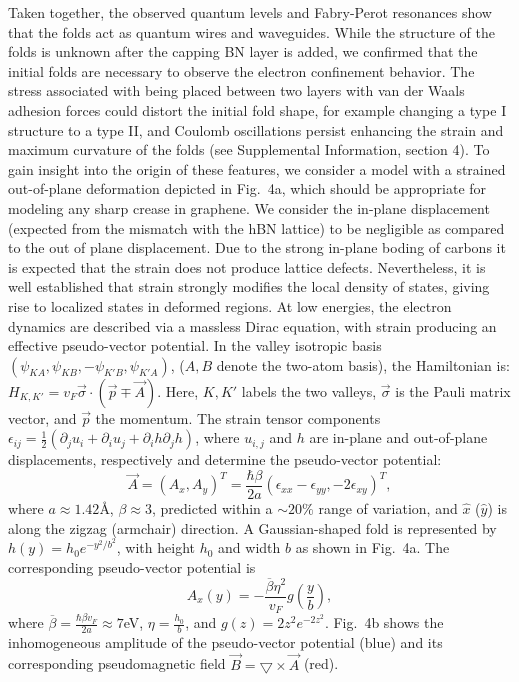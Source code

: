 \documentclass[journal=jacsat,manuscript=article]{achemso}
\begin{document}
Taken together, the observed quantum levels and Fabry-Perot resonances show that the folds act as quantum wires and waveguides. While the structure of the folds is unknown after the capping BN layer is added, we confirmed that the initial folds are necessary to observe the electron confinement behavior. The stress associated with being placed between two layers with van der Waals adhesion forces could distort the initial fold shape, for example changing a type I structure to a type II, and Coulomb oscillations persist enhancing the strain and maximum curvature of the folds (see Supplemental Information, section 4). To gain insight into the origin of these features, we consider a model with a strained out-of-plane deformation depicted in Fig.~4a, which should be appropriate for modeling any sharp crease in graphene.  We consider the in-plane displacement (expected from the mismatch with the hBN lattice) to be negligible as compared to the out of plane displacement. Due to the strong in-plane boding of carbons it is expected that the strain does not produce lattice defects\cite{kim_multiply_2011}. Nevertheless, it is well established that strain strongly modifies the local density of states, giving rise to localized states in deformed regions\cite{pereira2009strain,Vozmediano2010,guinea2010energy,levy2010strain,klimov2012electromechanical,Carrillo-Bastos2014}. At low energies, the electron dynamics are described via a massless Dirac equation, with strain producing an effective pseudo-vector potential. In the valley isotropic basis $(\psi_{KA}, \psi_{KB}, -\psi_{K'B}, \psi_{K'A})$, ($A, B$ denote the two-atom basis), the Hamiltonian is\cite{pereira2009strain,Vozmediano2010,guinea2010energy,Carrillo-Bastos2016}:
$H_{K,K'}=v_F\vec{\sigma}\cdot\left(\vec{p}\mp\vec{A}\right)$. Here,
$K,K'$ labels the two valleys, $\vec\sigma$ is the Pauli matrix vector, and $\vec{p}$ the momentum. The strain tensor components $\epsilon_{ij}=\frac{1}{2}(\partial_j u_i+\partial_i u_j+\partial_i h \partial_j h)$, where $u_{i,j}$ and $h$ are in-plane and out-of-plane displacements, respectively and determine the pseudo-vector potential:
\begin{equation}
\vec{A}=\left(A_x,A_y\right)^T=\frac{\hbar\beta}{2a}\left(\epsilon_{xx}-\epsilon_{yy},-2\epsilon_{xy}\right)^T,
\end{equation}
where $a\approx1.42$\AA, $\beta\approx 3$, predicted within a $\sim 20\%$ range of variation\cite{Midtvedt2016}, and $\hat{x}$ ($\hat{y}$) is along the zigzag (armchair) direction\cite{Vozmediano2010}.
A Gaussian-shaped fold is represented by $h(y)=h_0e^{-y^2/b^2}$, with height $h_0$ and width $b$ as shown in Fig.~4a. The corresponding pseudo-vector potential is
\begin{equation}
A_{x}(y)=-\frac{\overline{\beta}\eta^2}{v_F}g\left(\frac{y}{b}\right),
\end{equation}
where $\overline{\beta}=\frac{\hbar\beta v_F}{2a}\approx7$eV, $\eta=\frac{h_0}{b}$, and $g(z)=2z^2e^{-2z^2}$. Fig.~4b shows the inhomogeneous amplitude of the pseudo-vector potential (blue) and its corresponding pseudomagnetic field $\vec{B} = \bigtriangledown \times \vec{A}$ (red).  
\end{document}
